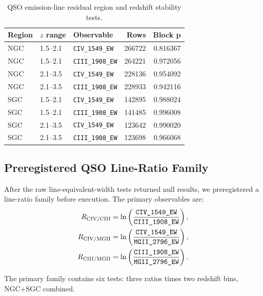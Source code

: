 \documentclass[11pt]{article}
\begin{document}
\begin{table}[h]
\centering
\caption{QSO emission-line residual region and redshift stability tests.}
\begin{tabular}{lllrr}
\toprule
Region & $z$ range & Observable & Rows & Block p \\
\midrule
NGC & 1.5--2.1 & \texttt{CIV\_1549\_EW} & 266722 & 0.816367 \\
NGC & 1.5--2.1 & \texttt{CIII\_1908\_EW} & 264221 & 0.972056 \\
NGC & 2.1--3.5 & \texttt{CIV\_1549\_EW} & 228136 & 0.954092 \\
NGC & 2.1--3.5 & \texttt{CIII\_1908\_EW} & 228933 & 0.942116 \\
SGC & 1.5--2.1 & \texttt{CIV\_1549\_EW} & 142895 & 0.988024 \\
SGC & 1.5--2.1 & \texttt{CIII\_1908\_EW} & 141485 & 0.996008 \\
SGC & 2.1--3.5 & \texttt{CIV\_1549\_EW} & 123642 & 0.990020 \\
SGC & 2.1--3.5 & \texttt{CIII\_1908\_EW} & 123698 & 0.966068 \\
\bottomrule
\end{tabular}
\end{table}

\subsection{Preregistered QSO Line-Ratio Family}

After the raw line-equivalent-width tests returned null results, we preregistered a line-ratio family before execution. The primary observables are:
\begin{align}
    R_{\rm CIV/CIII} &= \ln\left(\frac{\texttt{CIV\_1549\_EW}}{\texttt{CIII\_1908\_EW}}\right), \\
    R_{\rm CIV/MGII} &= \ln\left(\frac{\texttt{CIV\_1549\_EW}}{\texttt{MGII\_2796\_EW}}\right), \\
    R_{\rm CIII/MGII} &= \ln\left(\frac{\texttt{CIII\_1908\_EW}}{\texttt{MGII\_2796\_EW}}\right).
\end{align}

The primary family contains six tests: three ratios times two redshift bins, NGC+SGC combined.
\end{document}
